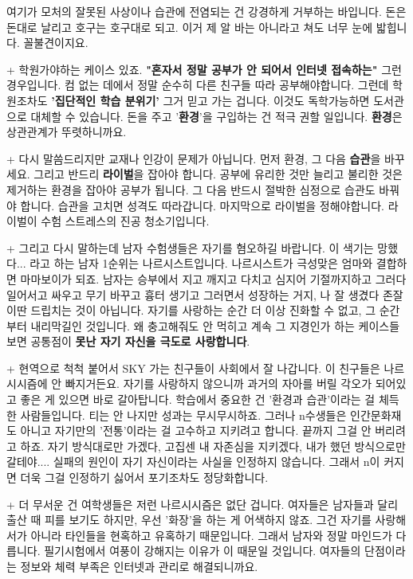 여기가 모처의 잘못된 사상이나 습관에 전염되는 건 강경하게 거부하는 바입니다.
돈은 돈대로 날리고 호구는 호구대로 되고. 이거 제 알 바는 아니라고 쳐도 너무 눈에 밟힙니다. 꼴불견이지요.
\vspace{5mm}

+ 학원가야하는 케이스 있죠.
\textbf{"혼자서 정말 공부가 안 되어서 인터넷 접속하는"} 그런 경우입니다. 컴 없는 데에서 정말 순수히 다른 친구들 따라 공부해야합니다.
그런데 학원조차도 \textbf{'집단적인 학습 분위기'} 그거 믿고 가는 겁니다.
이것도 독학가능하면 도서관으로 대체할 수 있습니다.
돈을 주고 '\textbf{환경}'을 구입하는 건 적극 권할 일입니다. \textbf{환경}은 상관관계가 뚜렷하니까요.
\vspace{5mm}

+ 다시 말씀드리지만 교재나 인강이 문제가 아닙니다.
먼저 환경, 그 다음 \textbf{습관}을 바꾸세요. 그리고 반드리 \textbf{라이벌}을 잡아야 합니다.
공부에 유리한 것만 늘리고 불리한 것은 제거하는 환경을 잡아야 공부가 됩니다.
그 다음 반드시 절박한 심정으로 습관도 바꿔야 합니다. 습관을 고치면 성격도 따라갑니다.
마지막으로 라이벌을 정해야합니다. 라이벌이 수험 스트레스의 진공 청소기입니다.
\vspace{5mm}

+ 그리고 다시 말하는데 남자 수험생들은 자기를 혐오하길 바랍니다.
이 색기는 망했다... 라고 하는 남자 1순위는 나르시스트입니다. 나르시스트가 극성맞은 엄마와 결합하면 마마보이가 되죠.
남자는 승부에서 지고 깨지고 다치고 심지어 기절까지하고 그러다 일어서고 싸우고 무기 바꾸고 흉터 생기고 그러면서 성장하는 거지,
나 잘 생겼다 존잘 이딴 드립치는 것이 아닙니다. 자기를 사랑하는 순간 더 이상 진화할 수 없고, 그 순간부터 내리막길인 것입니다.
왜 충고해줘도 안 먹히고 계속 그 지경인가 하는 케이스들 보면 공통점이 \textbf{못난 자기 자신을 극도로 사랑합니다}.
\vspace{5mm}

+ 현역으로 척척 붙어서 SKY 가는 친구들이 사회에서 잘 나갑니다.
이 친구들은 나르시시즘에 안 빠지거든요. 자기를 사랑하지 않으니까 과거의 자아를 버릴 각오가 되어있고 좋은 게 있으면 바로 갈아탑니다.
학습에서 중요한 건 '환경과 습관'이라는 걸 체득한 사람들입니다. 티는 안 나지만 성과는 무시무시하죠.
그러나 n수생들은 인간문화재도 아니고 자기만의 '전통'이라는 걸 고수하고 지키려고 합니다. 끝까지 그걸 안 버리려고 하죠.
자기 방식대로만 가겠다, 고집센 내 자존심을 지키겠다, 내가 했던 방식으로만 갈테야....
실패의 원인이 자기 자신이라는 사실을 인정하지 않습니다. 그래서 n이 커지면 더욱 그걸 인정하기 싫어서 포기조차도 정당화합니다.
\vspace{5mm}

+ 더 무서운 건 여학생들은 저런 나르시시즘은 없단 겁니다.
여자들은 남자들과 달리 출산 때 피를 보기도 하지만, 우선 '화장'을 하는 게 어색하지 않죠.
그건 자기를 사랑해서가 아니라 타인들을 현혹하고 유혹하기 때문입니다. 그래서 남자와 정말 마인드가 다릅니다.
필기시험에서 여풍이 강해지는 이유가 이 때문일 것입니다. 여자들의 단점이라는 정보와 체력 부족은 인터넷과 관리로 해결되니까요.
\vspace{5mm}




